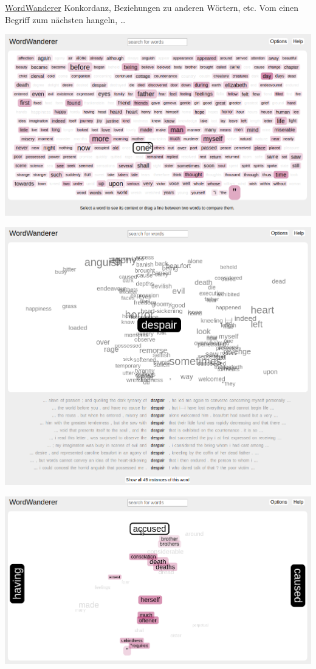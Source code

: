 \documentclass[10pt]{beamer}
\begin{document}
\begin{frame}[allowframebreaks]{\href{http://wordwanderer.org/}{WordWanderer}}
Konkordanz, Beziehungen zu anderen Wörtern, etc. Vom einen Begriff zum nächsten hangeln, \dots

\includegraphics[width=\textwidth]{wordwanderer1.png}

\includegraphics[width=\textwidth]{wordwanderer2.png}

\includegraphics[width=\textwidth]{wordwanderer3.png}
\end{frame}
\end{document}
